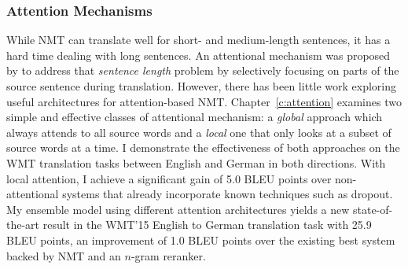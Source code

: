 \subsubsection{Attention Mechanisms} 
While NMT can translate well for short- and medium-length sentences, it 
has a hard time dealing with long sentences.
An attentional mechanism was proposed by  to address that {\it
sentence length} problem by
selectively focusing on parts of the source sentence during translation. However,
there has been little work exploring useful architectures for attention-based
NMT. Chapter~\ref{c:attention} examines two simple and effective classes of attentional
mechanism: a {\it global} approach which always attends to all source words and
a {\it local} one that only looks at a subset of source words at a time. 
I demonstrate the effectiveness of both approaches on the WMT translation
tasks between English and German in both directions. With local
attention, I achieve a significant gain of 5.0 BLEU points over
non-attentional systems that 
already incorporate known techniques such as dropout. My ensemble 
model using different attention architectures yields a new
state-of-the-art result in the WMT'15 English to German
translation task with 25.9 BLEU points, an improvement of 1.0 BLEU points over the existing
best system backed by NMT and an $n$-gram reranker. 

